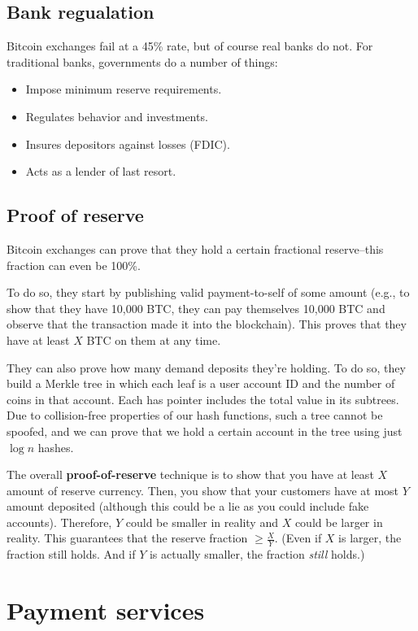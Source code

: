 \documentclass[12pt]{article}
\begin{document}
\subsection*{Bank regualation}

Bitcoin exchanges fail at a 45\% rate, but of course real banks do not. For traditional banks, governments do a number of things:
\begin{itemize}
\item Impose minimum reserve requirements.
\item Regulates behavior and investments.
\item Insures depositors against losses (FDIC).
\item Acts as a lender of last resort.
\end{itemize}

\subsection*{Proof of reserve}

Bitcoin exchanges can prove that they hold a certain fractional reserve--this fraction can even be 100\%.

To do so, they start by publishing valid payment-to-self of some amount (e.g., to show that they have 10,000 BTC, they can pay themselves 10,000 BTC and observe that the transaction made it into the blockchain). This proves that they have at least $X$ BTC on them at any time.

They can also prove how many demand deposits they're holding. To do so, they build a Merkle tree in which each leaf is a user account ID and the number of coins in that account. Each has pointer includes the total value in its subtrees. Due to collision-free properties of our hash functions, such a tree cannot be spoofed, and we can prove that we hold a certain account in the tree using just $\log{n}$ hashes.

The overall \textbf{proof-of-reserve} technique is to show that you have at least $X$ amount of reserve currency. Then, you show that your customers have at most $Y$ amount deposited (although this could be a lie as you could include fake accounts). Therefore, $Y$ could be smaller in reality and $X$ could be larger in reality. This guarantees that the reserve fraction $\geq \frac{X}{Y}$. (Even if $X$ is larger, the fraction still holds. And if $Y$ is actually smaller, the fraction \textit{still} holds.)

\section*{Payment services}
\end{document}
